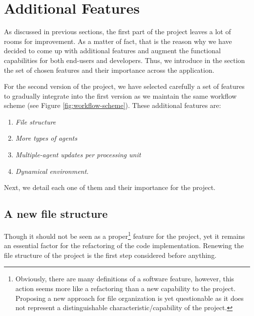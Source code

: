 %
%
%
%

\section{Additional Features}
As discussed in previous sections, the first part of the project leaves a lot of rooms for improvement. As a matter of fact, that is the reason why we have decided to come up with additional features and augment the functional capabilities for both end-users and developers. Thus, we introduce in the section the set of chosen features and their importance across the application.

For the second version of the project, we have selected carefully  a set of features to gradually integrate into the first version as we maintain the same workflow scheme (see Figure \ref{fig:workflow-scheme}). These additional features are:
\begin{enumerate}
    \item \textit{File structure}
    \item \textit{More types of agents}
    \item \textit{Multiple-agent updates per processing unit}
    \item \textit{Dynamical environment.}
\end{enumerate}

\noindent
Next, we detail each one of them and their importance for the project.

\subsection{A new file structure}
Though it should not be seen as a proper\footnote{Obviously, there are many definitions of a software feature, however, this action seems more like a refactoring than a new capability to the project. Proposing a new approach for file organization is yet questionable as it does not represent a distinguishable characteristic/capability of the project.} feature for the project, yet it remains an essential factor for the refactoring of the code implementation. Renewing the file structure of the project is the first step considered before anything.

